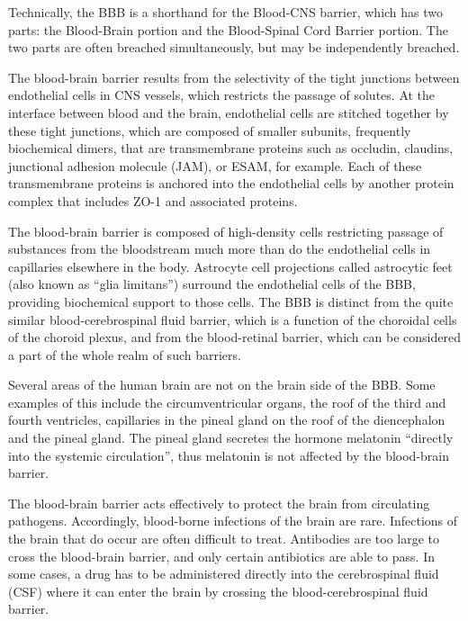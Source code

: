\documentclass[]{book}
\begin{document}
Technically, the BBB is a shorthand for the Blood-CNS barrier, which has two parts: the Blood-Brain portion and the Blood-Spinal Cord Barrier portion. The two parts are often breached simultaneously, but may be independently breached.

The blood-brain barrier results from the selectivity of the tight junctions between endothelial cells in CNS vessels, which restricts the passage of solutes. At the interface between blood and the brain, endothelial cells are stitched together by these tight junctions, which are composed of smaller subunits, frequently biochemical dimers, that are transmembrane proteins such as occludin, claudins, junctional adhesion molecule (JAM), or ESAM, for example. Each of these transmembrane proteins is anchored into the endothelial cells by another protein complex that includes ZO-1 and associated proteins.

The blood-brain barrier is composed of high-density cells restricting passage of substances from the bloodstream much more than do the endothelial cells in capillaries elsewhere in the body. Astrocyte cell projections called astrocytic feet (also known as ``glia limitans'') surround the endothelial cells of the BBB, providing biochemical support to those cells. The BBB is distinct from the quite similar blood-cerebrospinal fluid barrier, which is a function of the choroidal cells of the choroid plexus, and from the blood-retinal barrier, which can be considered a part of the whole realm of such barriers.

Several areas of the human brain are not on the brain side of the BBB. Some examples of this include the circumventricular organs, the roof of the third and fourth ventricles, capillaries in the pineal gland on the roof of the diencephalon and the pineal gland. The pineal gland secretes the hormone melatonin ``directly into the systemic circulation'', thus melatonin is not affected by the blood-brain barrier.

The blood-brain barrier acts effectively to protect the brain from circulating pathogens. Accordingly, blood-borne infections of the brain are rare. Infections of the brain that do occur are often difficult to treat. Antibodies are too large to cross the blood-brain barrier, and only certain antibiotics are able to pass. In some cases, a drug has to be administered directly into the cerebrospinal fluid (CSF) where it can enter the brain by crossing the blood-cerebrospinal fluid barrier.
\end{document}
